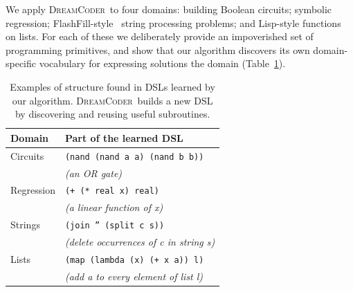 \documentclass{article}
\newcommand{\system}{\textsc{DreamCoder}~}
\newcommand{\code}[1]{{\footnotesize\texttt{#1}}}
\begin{document}

We apply \system to four domains:
 building Boolean circuits; symbolic regression; FlashFill-style~\cite{gulwani2011automating} string processing problems; and Lisp-style functions on lists.
 For each of these we deliberately provide an impoverished
 set of programming primitives,
 and show that our algorithm discovers
 its own domain-specific vocabulary for expressing solutions the domain (Table~\ref{initialExampleDSL}).
 \begin{table}
    \begin{tabular}{ll}
   \toprule
   Domain&Part of the learned DSL\\\midrule
   Circuits&\code{(nand (nand a a) (nand b b))}\\
   &\hspace{0.5cm} \emph{(an OR gate)}\\
   Regression& \code{(+ (* real x) real)} \\
      &\hspace{0.5cm} \emph{(a linear function of x)}\\
   Strings& \code{(join '' (split c s))}\\
   &\hspace{0.5cm} \emph{(delete occurrences of c in string s)}\\
   Lists& \code{(map (lambda (x) (+ x a)) l)}\\
   &\hspace{0.5cm} \emph{(add a to every element of list l)}
   \\\bottomrule
    \end{tabular}
    \caption{ Examples of structure found in DSLs  learned by our algorithm. \system builds a new DSL by discovering and reusing useful subroutines.}\label{initialExampleDSL}
 \end{table}


 
\end{document}
